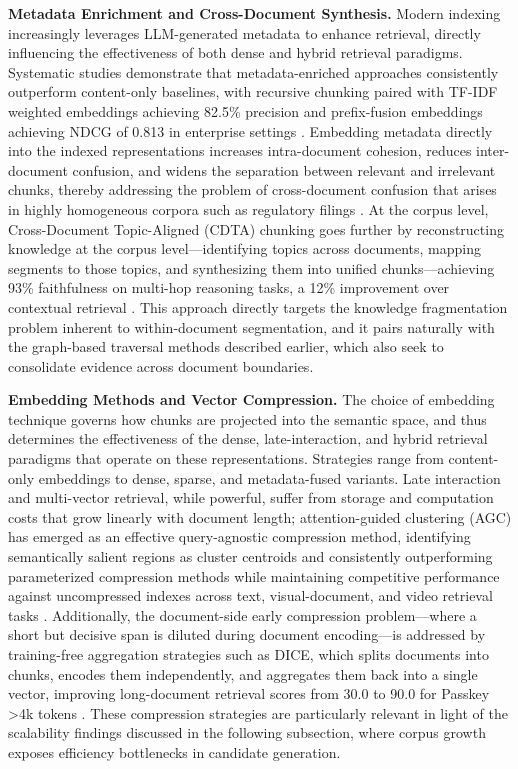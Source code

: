 \documentclass[11pt]{article}
\begin{document}
\textbf{Metadata Enrichment and Cross-Document Synthesis.} Modern indexing increasingly leverages LLM-generated metadata to enhance retrieval, directly influencing the effectiveness of both dense and hybrid retrieval paradigms. Systematic studies demonstrate that metadata-enriched approaches consistently outperform content-only baselines, with recursive chunking paired with TF-IDF weighted embeddings achieving 82.5\% precision and prefix-fusion embeddings achieving NDCG of 0.813 in enterprise settings \cite{ref90}. Embedding metadata directly into the indexed representations increases intra-document cohesion, reduces inter-document confusion, and widens the separation between relevant and irrelevant chunks, thereby addressing the problem of cross-document confusion that arises in highly homogeneous corpora such as regulatory filings \cite{ref91}. At the corpus level, Cross-Document Topic-Aligned (CDTA) chunking goes further by reconstructing knowledge at the corpus level---identifying topics across documents, mapping segments to those topics, and synthesizing them into unified chunks---achieving 93\% faithfulness on multi-hop reasoning tasks, a 12\% improvement over contextual retrieval \cite{ref92}. This approach directly targets the knowledge fragmentation problem inherent to within-document segmentation, and it pairs naturally with the graph-based traversal methods described earlier, which also seek to consolidate evidence across document boundaries.

\textbf{Embedding Methods and Vector Compression.} The choice of embedding technique governs how chunks are projected into the semantic space, and thus determines the effectiveness of the dense, late-interaction, and hybrid retrieval paradigms that operate on these representations. Strategies range from content-only embeddings to dense, sparse, and metadata-fused variants. Late interaction and multi-vector retrieval, while powerful, suffer from storage and computation costs that grow linearly with document length; attention-guided clustering (AGC) has emerged as an effective query-agnostic compression method, identifying semantically salient regions as cluster centroids and consistently outperforming parameterized compression methods while maintaining competitive performance against uncompressed indexes across text, visual-document, and video retrieval tasks \cite{ref93}. Additionally, the document-side early compression problem---where a short but decisive span is diluted during document encoding---is addressed by training-free aggregation strategies such as DICE, which splits documents into chunks, encodes them independently, and aggregates them back into a single vector, improving long-document retrieval scores from 30.0 to 90.0 for Passkey \textgreater4k tokens \cite{ref94}. These compression strategies are particularly relevant in light of the scalability findings discussed in the following subsection, where corpus growth exposes efficiency bottlenecks in candidate generation.
\end{document}
